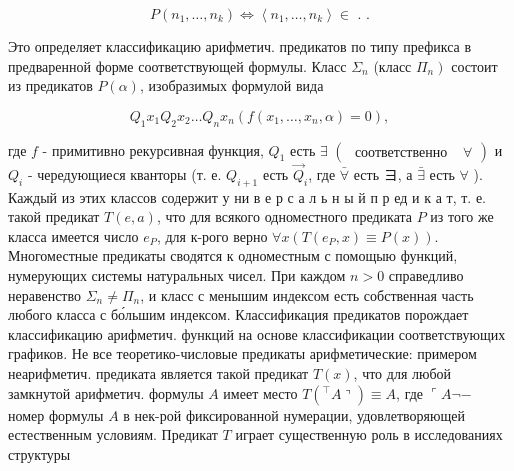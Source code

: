 \documentclass[10pt]{article}
\begin{document}
\[

P\left(n_{1}, \ldots, n_{k}\right) \Leftrightarrow\left\langle n_{1}, \ldots, n_{k}\right\rangle \in \mathscr{\text { . }} .

\]



Это определяет классификацию арифметич. предикатов по типу префикса в предваренной форме соответствующей формулы. Класс $\Sigma_{n}$ (класс $\left.\Pi_{n}\right)$ состоит из предикатов $P(\alpha)$, изобразимых формулой вида



\[

Q_{1} x_{1} Q_{2} x_{2} \ldots Q_{n} x_{n}\left(f\left(x_{1}, \ldots, x_{n}, \alpha\right)=0\right),

\]



где $f$ - примитивно рекурсивная функция, $Q_{1}$ есть $\exists$ $\left(\begin{array}{ll}\text { соответственно } & \forall\end{array}\right)$ и $Q_{i}$ - чередующиеся кванторы (т. е. $Q_{i+1}$ есть $\vec{Q}_{i}$, где $\bar{\forall}$ есть $ヨ$, а $\bar{\exists}$ есть $\forall$ ). Каждый из этих классов содержит у ни в е р с а л ь н ы й п р ед и к а т, т. е. такой предикат $T(e, a)$, что для всякого одноместного предиката $P$ из того же класса имеется число $e_{P}$, для к-рого верно $\forall x\left(T\left(e_{P}, x\right) \equiv P(x)\right)$. Многоместные предикаты сводятся к одноместным с помощыю функций, нумерующих системы натуральных чисел. При каждом $n>0$ справедливо неравенство $\Sigma_{n} \neq \Pi_{n}$, и класс с менышим индексом есть собственная часть любого класса с бо́льшим индексом. Классификация предикатов порождает классификацию арифметич. функций на основе классификации соответствующих графиков. Не все теоретико-числовые предикаты арифметические: примером неарифметич. предиката является такой предикат $T(x)$, что для любой замкнутой арифметич. формулы $A$ имеет место $\left.T\left({ }^{\top} A\right\urcorner\right) \equiv A$, где $\ulcorner A \neg-$ номер формулы $A$ в нек-рой фиксированной нумерации, удовлетворяющей естественным условиям. Предикат $T$ играет существенную роль в исследованиях структуры
\end{document}
